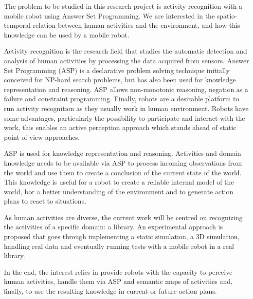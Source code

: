 \documentclass[a4paper,12pt,openany,oneside]{report}
\begin{document}
The problem to be studied in this research project is activity recognition with a mobile robot using Answer Set Programming. We are interested in the spatio-temporal relation between human activities and the environment, and how this knowledge can be used by a mobile robot. 

Activity recognition is the research field that studies the automatic detection and analysis of human activities by processing the data acquired from sensors. Answer Set Programming (ASP) is a declarative problem solving technique initially conceived for NP-hard search problems, but has also been used for knowledge representation and reasoning. ASP allows non-monotonic reasoning, negation as a failure and constraint programming. Finally, robots are a desirable platform to run activity recognition as they usually work in human environment. Robots have some advantages, particularly the possibility to participate and interact with the work, this enables an active perception approach which stands ahead of static point of view approaches.

ASP is used for knowledge representation and reasoning. Activities and domain knowledge needs to be available via ASP to process incoming observations from the world and use them to create a conclusion of the current state of the world. This knowledge is useful for a robot to create a reliable internal model of the world, bor a better understanding of the environment and to generate action plans to react to situations. 

As human activities are diverse, the current work will be centred on recognizing the activities of a specific domain: a library. An experimental approach is proposed that goes through implementing a static simulation, a 3D simulation, handling real data and eventually running tests with a mobile robot in a real library. 

In the end, the interest relies in provide robots with the capacity to perceive human activities, handle them via ASP and semantic maps of activities and, finally, to use the resulting knowledge in current or future action plans.






%
%
\end{document}
